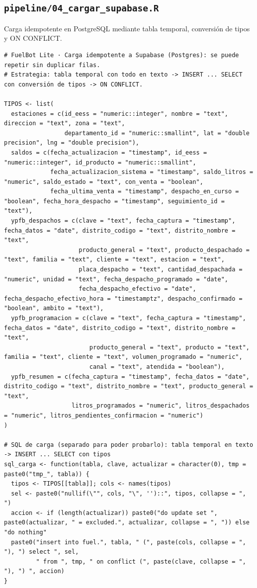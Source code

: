\subsection{\texttt{pipeline/04\_cargar\_supabase.R}}
Carga idempotente en PostgreSQL mediante tabla temporal, conversión de tipos y ON CONFLICT.
\begin{lstlisting}[style=anexoR]
# FuelBot Lite · Carga idempotente a Supabase (Postgres): se puede repetir sin duplicar filas.
# Estrategia: tabla temporal con todo en texto -> INSERT ... SELECT con conversión de tipos -> ON CONFLICT.

TIPOS <- list(
  estaciones = c(id_eess = "numeric::integer", nombre = "text", direccion = "text", zona = "text",
                 departamento_id = "numeric::smallint", lat = "double precision", lng = "double precision"),
  saldos = c(fecha_actualizacion = "timestamp", id_eess = "numeric::integer", id_producto = "numeric::smallint",
             fecha_actualizacion_sistema = "timestamp", saldo_litros = "numeric", saldo_estado = "text", con_venta = "boolean",
             fecha_ultima_venta = "timestamp", despacho_en_curso = "boolean", fecha_hora_despacho = "timestamp", seguimiento_id = "text"),
  ypfb_despachos = c(clave = "text", fecha_captura = "timestamp", fecha_datos = "date", distrito_codigo = "text", distrito_nombre = "text",
                     producto_general = "text", producto_despachado = "text", familia = "text", cliente = "text", estacion = "text",
                     placa_despacho = "text", cantidad_despachada = "numeric", unidad = "text", fecha_despacho_programado = "date",
                     fecha_despacho_efectivo = "date", fecha_despacho_efectivo_hora = "timestamptz", despacho_confirmado = "boolean", ambito = "text"),
  ypfb_programacion = c(clave = "text", fecha_captura = "timestamp", fecha_datos = "date", distrito_codigo = "text", distrito_nombre = "text",
                        producto_general = "text", producto = "text", familia = "text", cliente = "text", volumen_programado = "numeric",
                        canal = "text", atendida = "boolean"),
  ypfb_resumen = c(fecha_captura = "timestamp", fecha_datos = "date", distrito_codigo = "text", distrito_nombre = "text", producto_general = "text",
                   litros_programados = "numeric", litros_despachados = "numeric", litros_pendientes_confirmacion = "numeric")
)

# SQL de carga (separado para poder probarlo): tabla temporal en texto -> INSERT ... SELECT con tipos
sql_carga <- function(tabla, clave, actualizar = character(0), tmp = paste0("tmp_", tabla)) {
  tipos <- TIPOS[[tabla]]; cols <- names(tipos)
  sel <- paste0("nullif(\"", cols, "\", '')::", tipos, collapse = ", ")
  accion <- if (length(actualizar)) paste0("do update set ", paste0(actualizar, " = excluded.", actualizar, collapse = ", ")) else "do nothing"
  paste0("insert into fuel.", tabla, " (", paste(cols, collapse = ", "), ") select ", sel,
         " from ", tmp, " on conflict (", paste(clave, collapse = ", "), ") ", accion)
}


\end{lstlisting}
